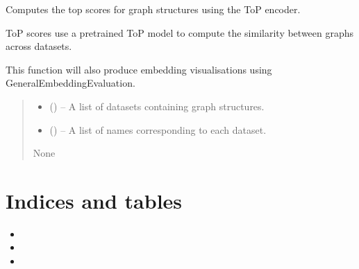 \documentclass[letterpaper,10pt,english]{sphinxhowto}
\begin{document}
\begin{fulllineitems}
\label{\detokenize{top:top.compute_top_scores}}
\pysigstartsignatures
{}
\pysigstopsignatures
\sphinxAtStartPar
Computes the top scores for graph structures using the ToP encoder.

\sphinxAtStartPar
ToP scores use a pre\sphinxhyphen{}trained ToP model to compute the similarity between graphs across datasets.

\sphinxAtStartPar
This function will also produce embedding visualisations using GeneralEmbeddingEvaluation.
\begin{quote}\begin{description}
\begin{itemize}
\item {} 
\sphinxAtStartPar
{} () – A list of datasets containing graph structures.

\item {} 
\sphinxAtStartPar
{} () – A list of names corresponding to each dataset.

\end{itemize}

\sphinxAtStartPar
None

\end{description}\end{quote}

\end{fulllineitems}



\section{Indices and tables}
\label{\detokenize{index:indices-and-tables}}\begin{itemize}
\item {} 
\sphinxAtStartPar
{}

\item {} 
\sphinxAtStartPar
{}

\item {} 
\sphinxAtStartPar
{}

\end{itemize}
\end{document}
